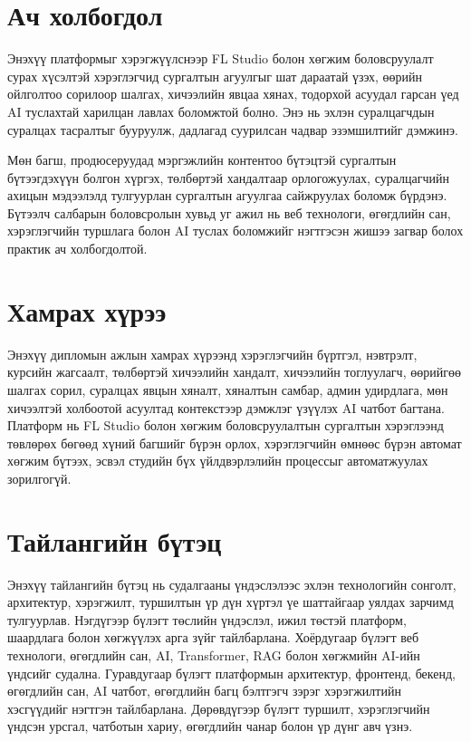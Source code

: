 \section*{Ач холбогдол}
Энэхүү платформыг хэрэгжүүлснээр FL Studio болон хөгжим боловсруулалт сурах хүсэлтэй хэрэглэгчид сургалтын агуулгыг шат дараатай үзэх, өөрийн ойлголтоо сорилоор шалгах, хичээлийн явцаа хянах, тодорхой асуудал гарсан үед AI туслахтай харилцан лавлах боломжтой болно. Энэ нь эхлэн суралцагчдын суралцах тасралтыг бууруулж, дадлагад суурилсан чадвар эзэмшилтийг дэмжинэ.

Мөн багш, продюсеруудад мэргэжлийн контентоо бүтэцтэй сургалтын бүтээгдэхүүн болгон хүргэх, төлбөртэй хандалтаар орлогожуулах, суралцагчийн ахицын мэдээлэлд тулгуурлан сургалтын агуулгаа сайжруулах боломж бүрдэнэ. Бүтээлч салбарын боловсролын хувьд уг ажил нь веб технологи, өгөгдлийн сан, хэрэглэгчийн туршлага болон AI туслах боломжийг нэгтгэсэн жишээ загвар болох практик ач холбогдолтой.

\section*{Хамрах хүрээ}
Энэхүү дипломын ажлын хамрах хүрээнд хэрэглэгчийн бүртгэл, нэвтрэлт, курсийн жагсаалт, төлбөртэй хичээлийн хандалт, хичээлийн тоглуулагч, өөрийгөө шалгах сорил, суралцах явцын хяналт, хяналтын самбар, админ удирдлага, мөн хичээлтэй холбоотой асуултад контекстээр дэмжлэг үзүүлэх AI чатбот багтана. Платформ нь FL Studio болон хөгжим боловсруулалтын сургалтын хэрэглээнд төвлөрөх бөгөөд хүний багшийг бүрэн орлох, хэрэглэгчийн өмнөөс бүрэн автомат хөгжим бүтээх, эсвэл студийн бүх үйлдвэрлэлийн процессыг автоматжуулах зорилгогүй.

\section*{Тайлангийн бүтэц}
Энэхүү тайлангийн бүтэц нь судалгааны үндэслэлээс эхлэн технологийн сонголт, архитектур, хэрэгжилт, туршилтын үр дүн хүртэл үе шаттайгаар уялдах зарчимд тулгуурлав. Нэгдүгээр бүлэгт төслийн үндэслэл, ижил төстэй платформ, шаардлага болон хөгжүүлэх арга зүйг тайлбарлана. Хоёрдугаар бүлэгт веб технологи, өгөгдлийн сан, AI, Transformer, RAG болон хөгжмийн AI-ийн үндсийг судална. Гуравдугаар бүлэгт платформын архитектур, фронтенд, бекенд, өгөгдлийн сан, AI чатбот, өгөгдлийн багц бэлтгэгч зэрэг хэрэгжилтийн хэсгүүдийг нэгтгэн тайлбарлана. Дөрөвдүгээр бүлэгт туршилт, хэрэглэгчийн үндсэн урсгал, чатботын хариу, өгөгдлийн чанар болон үр дүнг авч үзнэ.
